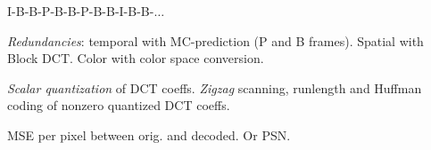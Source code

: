 \begin{algorithm}
  {\color{H1}I-B-B-P-B-B-P-B-B}-{\color{H3}I-B-B-\(\ldots\)}
\end{algorithm}

\begin{definition}
  \textit{Redundancies}: temporal with MC-prediction (P and B frames).
  Spatial with Block DCT.
  Color with color space conversion.

  \textit{Scalar quantization} of DCT coeffs. \textit{Zigzag} scanning, runlength and Huffman coding of nonzero quantized DCT coeffs.
\end{definition}

\begin{definition}
  MSE per pixel between orig. and decoded.
  Or PSN. 
\end{definition}
